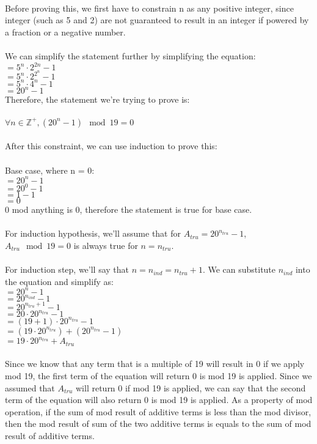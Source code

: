 \begin{enumerate}
    \\Before proving this, we first have to constrain n as any positive integer, since integer (such as 5 and 2) are not guaranteed to result in an integer if powered by a fraction or a negative number. 
    \\\\We can simplify the statement further by simplifying the equation:
\\$= 5^n\cdot2^{2n} - 1 $\\$= 5^n\cdot2^{2^{n}} - 1 $\\$= 5^n\cdot4^n - 1 $\\$= 20^n - 1$ 
    \\Therefore, the statement we're trying to prove is:
    \\
    \\$\forall n \in \mathbb{Z}^{+}, (20^n - 1)\mod19 = 0$
    \\
    \\ After this constraint, we can use induction to prove this:
    \\
    \\Base case, where n = 0:
\\$= 20^n - 1 $\\$= 20^0 - 1 $\\$= 1 - 1 $\\$= 0$
\\0 mod anything is 0, therefore the statement is true for base case.
\\
\\For induction hypothesis, we'll assume that for $A_{tru} = 20^{n_{tru}} - 1$, $A_{tru} \mod 19 = 0$ is always true for $n = n_{tru}$.
\\
\\For induction step, we'll say that $n = n_{ind} = n_{tru} + 1$. We can substitute $n_{ind}$ into the equation and simplify as:
\\$= 20^n - 1 $\\$= 20^{n_{ind}} - 1 $\\$= 20^{n_{tru}+1} - 1 $\\$= 20\cdot20^{n_{tru}} - 1 $\\$= (19+1)\cdot20^{n_{tru}} - 1 $\\$= (19\cdot20^{n_{tru}}) + (20^{n_{tru}} - 1) $\\$= 19\cdot20^{n_{tru}} + A_{tru}$
\\
\\ Since we know that any term that is a multiple of 19 will result in 0 if we apply mod 19, the first term of the equation will return 0 is mod 19 is applied. Since we assumed that $A_{tru}$ will return 0 if mod 19 is applied, we can say that the second term of the equation will also return 0 is mod 19 is applied. As a property of mod operation, if the sum of mod result of additive terms is less than the mod divisor, then the mod result of sum of the two additive terms is equals to the sum of mod result of additive terms. 

\end{enumerate}
